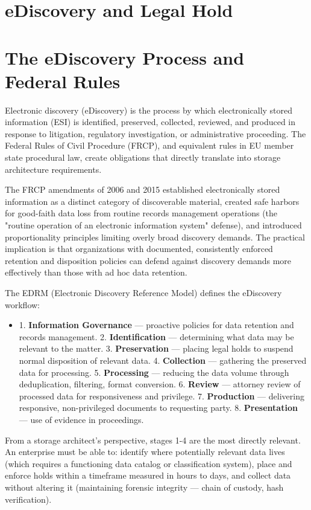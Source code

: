 \section{eDiscovery and Legal Hold}
\section{The eDiscovery Process and Federal Rules}
Electronic discovery (eDiscovery) is the process by which electronically stored information (ESI) is identified, preserved, collected, reviewed, and produced in response to litigation, regulatory investigation, or administrative proceeding. The Federal Rules of Civil Procedure (FRCP), and equivalent rules in EU member state procedural law, create obligations that directly translate into storage architecture requirements.

The FRCP amendments of 2006 and 2015 established electronically stored information as a distinct category of discoverable material, created safe harbors for good-faith data loss from routine records management operations (the "routine operation of an electronic information system" defense), and introduced proportionality principles limiting overly broad discovery demands. The practical implication is that organizations with documented, consistently enforced retention and disposition policies can defend against discovery demands more effectively than those with ad hoc data retention.

The EDRM (Electronic Discovery Reference Model) defines the eDiscovery workflow:

\begin{itemize}
  \item 1. \textbf{Information Governance} --- proactive policies for data retention and records management.
2. \textbf{Identification} --- determining what data may be relevant to the matter.
3. \textbf{Preservation} --- placing legal holds to suspend normal disposition of relevant data.
4. \textbf{Collection} --- gathering the preserved data for processing.
5. \textbf{Processing} --- reducing the data volume through deduplication, filtering, format conversion.
6. \textbf{Review} --- attorney review of processed data for responsiveness and privilege.
7. \textbf{Production} --- delivering responsive, non-privileged documents to requesting party.
8. \textbf{Presentation} --- use of evidence in proceedings.
\end{itemize}

From a storage architect's perspective, stages 1-4 are the most directly relevant. An enterprise must be able to: identify where potentially relevant data lives (which requires a functioning data catalog or classification system), place and enforce holds within a timeframe measured in hours to days, and collect data without altering it (maintaining forensic integrity --- chain of custody, hash verification).

